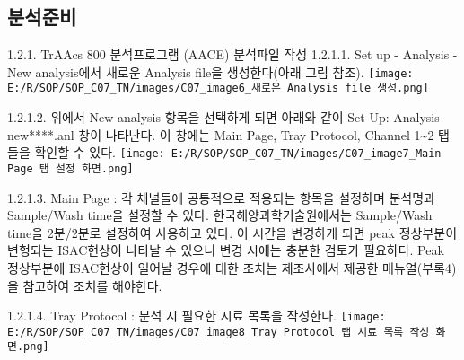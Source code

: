 \documentclass[
]{book}
\begin{document}
\hypertarget{uxbd84uxc11duxc900uxbe44-1}{%
\subsection{분석준비}\label{uxbd84uxc11duxc900uxbe44-1}}

1.2.1. TrAAcs 800 분석프로그램 (AACE) 분석파일 작성
1.2.1.1. Set up - Analysis - New analysis에서 새로운 Analysis file을 생성한다(아래 그림 참조).
\texttt{[image: E:/R/SOP/SOP\_C07\_TN/images/C07\_image6\_새로운 Analysis file 생성.png]}

1.2.1.2. 위에서 New analysis 항목을 선택하게 되면 아래와 같이 Set Up: Analysis-new****.anl 창이 나타난다. 이 창에는 Main Page, Tray Protocol, Channel 1\textasciitilde2 탭들을 확인할 수 있다.
\texttt{[image: E:/R/SOP/SOP\_C07\_TN/images/C07\_image7\_Main Page 탭 설정 화면.png]}

1.2.1.3. Main Page : 각 채널들에 공통적으로 적용되는 항목을 설정하며 분석명과 Sample/Wash time을 설정할 수 있다. 한국해양과학기술원에서는 Sample/Wash time을 2분/2분로 설정하여 사용하고 있다. 이 시간을 변경하게 되면 peak 정상부분이 변형되는 ISAC현상이 나타날 수 있으니 변경 시에는 충분한 검토가 필요하다. Peak 정상부분에 ISAC현상이 일어날 경우에 대한 조치는 제조사에서 제공한 매뉴얼(부록4)을 참고하여 조치를 해야한다.

1.2.1.4. Tray Protocol : 분석 시 필요한 시료 목록을 작성한다.
\texttt{[image: E:/R/SOP/SOP\_C07\_TN/images/C07\_image8\_Tray Protocol 탭 시료 목록 작성 화면.png]}
\end{document}
